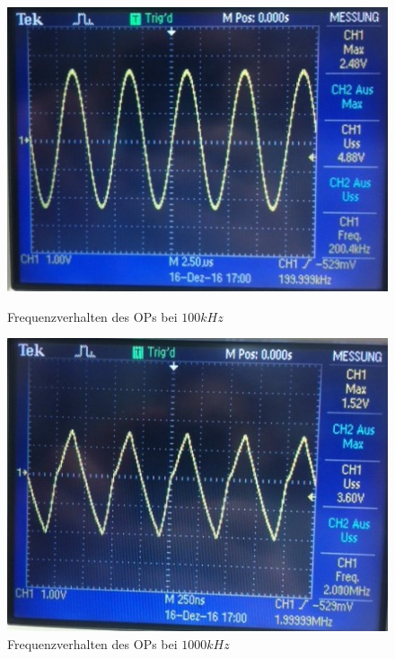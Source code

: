 \begin{figure}[!ht]
\begin{minipage}{0.4\textwidth}
\begin{center}
\includegraphics[scale=0.6]{bild/image2}
\caption{Frequenzverhalten des OPs bei $100kHz$}
\end{center}
\end{minipage} \hfill
\begin{minipage}{0.4\textwidth}
\begin{center}
\includegraphics[scale=0.6]{bild/image3}
\caption{Frequenzverhalten des OPs bei $1000kHz$}
\end{center}
\end{minipage}
\end{figure}
